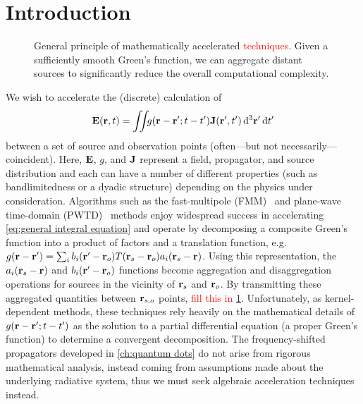 \section{Introduction}

\begin{figure}[]
  \centering
  
  \caption{General principle of mathematically accelerated \textcolor{red}{techniques}.
    Given a sufficiently smooth Green's function, we can aggregate distant sources to significantly reduce the overall computational complexity.
  }
  \label{fig:box to box}
\end{figure}

We wish to accelerate the (discrete) calculation of 
\begin{equation}
  \vb{E}(\vb{r}, t) = \iint_{} g(\vb{r} - \vb{r}'; t - t') \vb{J}(\vb{r}', t') \dd[3]{\vb{r}'} \dd{t'}
  \label{eq:general integral equation}
\end{equation}
between a set of source and observation points (often---but not necessarily---coincident).
Here, $\vb{E}$, $g$, and $\vb{J}$ represent a field, propagator, and source distribution and each can have a number of different properties (such as bandlimitedness or a dyadic structure) depending on the physics under consideration.
Algorithms such as the fast-multipole (FMM)~\cite{Greengard1987} and plane-wave time-domain (PWTD)~\cite{Ergin1999} methods enjoy widespread success in accelerating \cref{eq:general integral equation} and operate by decomposing a composite Green's function into a product of factors and a translation function, e.g.\ $g(\vb{r} - \vb{r}') = \sum_i b_i(\vb{r}' - \vb{r}_o) T(\vb{r}_s - \vb{r}_o) a_i(\vb{r}_s - \vb{r})$.
Using this representation, the $a_i(\vb{r}_s - \vb{r})$ and $b_i(\vb{r}' - \vb{r}_o)$ functions become aggregation and disaggregation operations for sources in the vicinity of $\vb{r}_s$ and $\vb{r}_o$.
By transmitting these aggregated quantities between $\vb{r}_{s,o}$ points, \textcolor{red}{fill this in} \cref{fig:box to box}.
Unfortunately, as kernel-dependent methods, these techniques rely heavily on the mathematical details of $g(\vb{r} - \vb{r}'; t - t')$ as the solution to a partial differential equation (a proper Green's function) to determine a convergent decomposition.
The frequency-shifted propagators developed in \cref{ch:quantum dots} do not arise from rigorous mathematical analysis, instead coming from assumptions made about the underlying radiative system, thus we must seek algebraic acceleration techniques instead.

